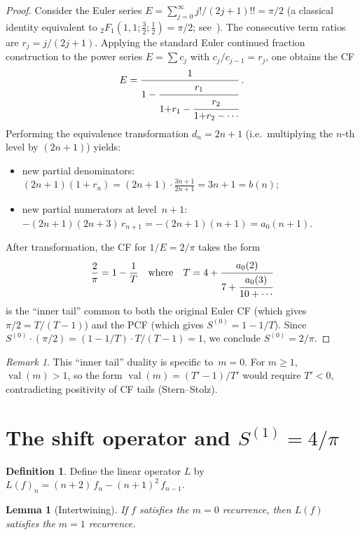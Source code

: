 \documentclass[11pt]{article}
\newcommand{\val}{\operatorname{val}}
\newtheorem{lemma}[theorem]{Lemma}
\theoremstyle{definition}
\newtheorem{definition}[theorem]{Definition}
\theoremstyle{remark}
\newtheorem{remark}[theorem]{Remark}
\begin{document}
\begin{proof}
Consider the Euler series
$E = \sum_{j=0}^{\infty} j!/(2j{+}1)!! = \pi/2$
(a classical identity equivalent to
${}_2F_1(1,1;\frac{3}{2};\frac{1}{2}) = \pi/2$;
see~\cite[\S15.4]{nist2024dlmf}).
The consecutive term ratios are $r_j = j/(2j{+}1)$.
Applying the standard Euler continued fraction
construction to the power series $E = \sum c_j$ with
$c_j/c_{j-1} = r_j$, one obtains the CF
\[
  E = \frac{1}{1 - \cfrac{r_1}{1{+}r_1 - \cfrac{r_2}{1{+}r_2 - \cdots}}}\,.
\]
Performing the equivalence transformation $d_n = 2n{+}1$
(i.e.\ multiplying the $n$-th level by $(2n{+}1)$) yields:
\begin{itemize}
\item new partial denominators:
  $(2n{+}1)(1{+}r_n) = (2n{+}1)\cdot\frac{3n{+}1}{2n{+}1} = 3n{+}1 = b(n)$;
\item new partial numerators at level~$n{+}1$:
  $-(2n{+}1)(2n{+}3)\,r_{n+1} = -(2n{+}1)(n{+}1) = a_0(n{+}1)$.
\end{itemize}
After transformation, the CF for $1/E = 2/\pi$ takes the form
\[
  \frac{2}{\pi} = 1 - \frac{1}{T}
  \quad\text{where}\quad
  T = 4 + \cfrac{a_0(2)}{7 + \cfrac{a_0(3)}{10 + \cdots}}
\]
is the ``inner tail'' common to both the original Euler CF
(which gives $\pi/2 = T/(T{-}1)$) and the PCF
(which gives $S^{(0)} = 1 - 1/T$).
Since $S^{(0)}\cdot(\pi/2) = (1-1/T)\cdot T/(T{-}1) = 1$,
we conclude $S^{(0)} = 2/\pi$.
\end{proof}

\begin{remark}
This ``inner tail'' duality is specific to~$m{=}0$.
For $m \geq 1$, $\val(m) > 1$, so the form
$\val(m) = (T'{-}1)/T'$ would require $T' < 0$,
contradicting positivity of CF tails (Stern--Stolz).
\end{remark}


\section{The shift operator and $S^{(1)}=4/\pi$}\label{sec:shift}

\begin{definition}\label{def:shift}
Define the linear operator $L$ by
$L(f)_n = (n{+}2)\,f_n - (n{+}1)^2\,f_{n-1}$.
\end{definition}

\begin{lemma}[Intertwining]\label{lem:intertwine}
If $f$ satisfies the $m{=}0$ recurrence,
then $L(f)$ satisfies the $m{=}1$ recurrence.
\end{lemma}
\end{document}
